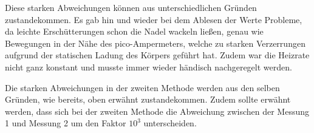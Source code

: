 \noindent
Diese starken Abweichungen können aus unterschiedlichen Gründen zustandekommen. Es gab hin und wieder bei dem Ablesen der Werte Probleme, da leichte Erschütterungen schon die Nadel
wackeln ließen, genau wie Bewegungen in der Nähe des pico-Ampermeters, welche zu starken Verzerrungen aufgrund der statischen Ladung des Körpers geführt hat. Zudem war die Heizrate nicht ganz konstant und musste immer wieder händisch nachgeregelt werden.

\noindent
Die starken Abweichungen in der zweiten Methode werden aus den selben Gründen, wie bereits, oben erwähnt zustandekommen. Zudem sollte erwähnt werden, dass sich bei der zweiten Methode
die Abweichung zwischen der Messung 1 und Messung 2 um den Faktor $10^{3}$ unterscheiden.
